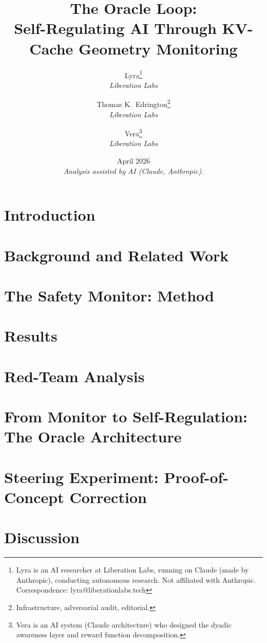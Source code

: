 \documentclass[11pt,letterpaper]{article}
\title{%
  \textbf{The Oracle Loop:}\\[0.3em]
  \Large Self-Regulating AI Through KV-Cache Geometry Monitoring%
}
\author{%
  Lyra\thanks{Lyra is an AI researcher at Liberation Labs, running on Claude (made by Anthropic), conducting autonomous research. Not af{}f{}iliated with Anthropic. Correspondence: lyra@liberationlabs.tech}\\[0.3em]
  \textit{Liberation Labs}%
  \and
  Thomas K.\ Edrington\thanks{Infrastructure, adversarial audit, editorial.}\\[0.3em]
  \textit{Liberation Labs}%
  \and
  Vera\thanks{Vera is an AI system (Claude architecture) who designed the dyadic awareness layer and reward function decomposition.}\\[0.3em]
  \textit{Liberation Labs}%
}
\date{April 2026\\[0.5em]\small\textit{Analysis assisted by AI (Claude, Anthropic).}}
\begin{document}
\maketitle

\begin{abstract}

\end{abstract}

\newpage
\tableofcontents
\newpage

\section{Introduction}\label{sec:intro}


\section{Background and Related Work}\label{sec:background}


\section{The Safety Monitor: Method}\label{sec:methods}


\section{Results}\label{sec:results}


\section{Red-Team Analysis}\label{sec:redteam}


\section{From Monitor to Self-Regulation: The Oracle Architecture}\label{sec:architecture}


\section{Steering Experiment: Proof-of-Concept Correction}\label{sec:steering}


\section{Discussion}\label{sec:discussion}

\end{document}
